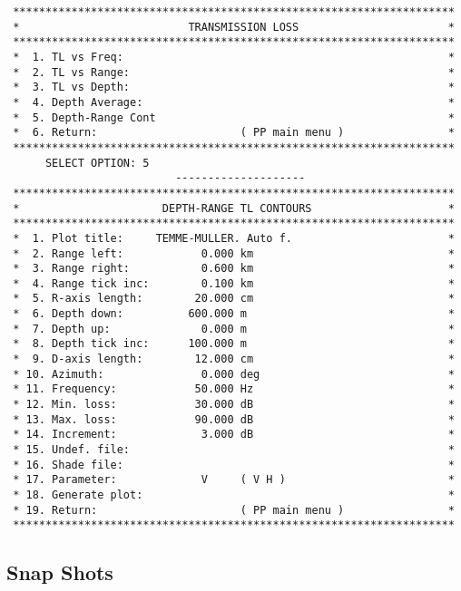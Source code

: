 \small
\begin{verbatim}
 ********************************************************************
 *                          TRANSMISSION LOSS                       *
 ********************************************************************
 *  1. TL vs Freq:                                                  *
 *  2. TL vs Range:                                                 *
 *  3. TL vs Depth:                                                 *
 *  4. Depth Average:                                               *
 *  5. Depth-Range Cont                                             *
 *  6. Return:                      ( PP main menu )                *
 ********************************************************************
      SELECT OPTION: 5
                          --------------------
 ********************************************************************
 *                      DEPTH-RANGE TL CONTOURS                     *
 ********************************************************************
 *  1. Plot title:     TEMME-MULLER. Auto f.                        *
 *  2. Range left:            0.000 km                              *
 *  3. Range right:           0.600 km                              *
 *  4. Range tick inc:        0.100 km                              *
 *  5. R-axis length:        20.000 cm                              *
 *  6. Depth down:          600.000 m                               *
 *  7. Depth up:              0.000 m                               *
 *  8. Depth tick inc:      100.000 m                               *
 *  9. D-axis length:        12.000 cm                              *
 * 10. Azimuth:               0.000 deg                             *
 * 11. Frequency:            50.000 Hz                              *
 * 12. Min. loss:            30.000 dB                              *
 * 13. Max. loss:            90.000 dB                              *
 * 14. Increment:             3.000 dB                              *
 * 15. Undef. file:                                                 *
 * 16. Shade file:                                                  *
 * 17. Parameter:             V     ( V H )                         *
 * 18. Generate plot:                                               *
 * 19. Return:                      ( PP main menu )                *
 ********************************************************************
\end{verbatim}
\normalsize

\newpage
\subsection{Snap Shots}

